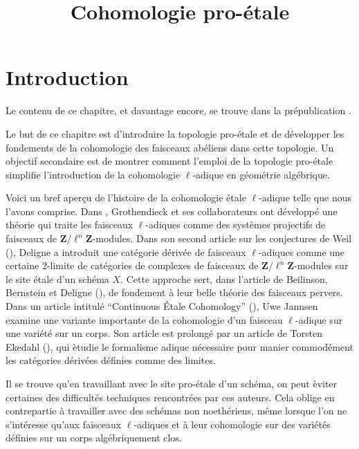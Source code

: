 

%


\title{Cohomologie pro-\'etale}


\maketitle

\label{section-phantom}

\tableofcontents

\section{Introduction}
\label{section-introduction}

\noindent
Le contenu de ce chapitre, et davantage encore, se trouve dans la pr\'epublication \cite{BS}.

\medskip\noindent
Le but de ce chapitre est d'introduire la topologie pro-\'etale et de
d\'evelopper les fondements de la cohomologie des faisceaux ab\'eliens dans cette topologie.
Un objectif secondaire est de montrer comment l'emploi de la topologie pro-\'etale simplifie
l'introduction de la cohomologie $\ell$-adique en g\'eom\'etrie alg\'ebrique.

\medskip\noindent
Voici un bref aper\c{c}u de l'histoire de la cohomologie \'etale $\ell$-adique
telle que nous l'avons comprise.
Dans \cite[Expos\'es V et VI]{SGA5}, Grothendieck et ses collaborateurs ont d\'evelopp\'e une th\'eorie
qui traite les faisceaux $\ell$-adiques comme des syst\`emes projectifs de faisceaux de
$\mathbf{Z}/\ell^n\mathbf{Z}$-modules.
Dans son second article sur les conjectures de Weil (\cite{WeilII}), Deligne a introduit
une cat\'egorie d\'eriv\'ee de faisceaux $\ell$-adiques comme une certaine 2-limite de cat\'egories
de complexes de faisceaux de $\mathbf{Z}/\ell^n\mathbf{Z}$-modules sur le
site \'etale d'un sch\'ema $X$. Cette approche sert, dans l'article de
Beilinson, Bernstein et Deligne (\cite{BBD}), de fondement \`a leur
belle th\'eorie des faisceaux pervers. Dans un article intitul\'e ``Continuous
\'Etale Cohomology'' (\cite{Jannsen}), Uwe Jannsen examine une variante importante
de la cohomologie d'un faisceau $\ell$-adique sur une vari\'et\'e sur un corps.
Son article est prolong\'e par un article de Torsten Ekedahl (\cite{Ekedahl}),
qui \`etudie le formalisme adique n\'ecessaire pour manier commod\'ement les cat\'egories
d\'eriv\'ees d\'efinies comme des limites.

\medskip\noindent
Il se trouve qu'en travaillant avec le site pro-\'etale d'un sch\'ema,
on peut \`eviter certaines des difficult\'es techniques rencontr\'ees par ces auteurs.
Cela oblige en contrepartie \`a travailler avec des sch\'emas non noeth\'eriens,
m\^eme lorsque l'on ne s'int\'eresse qu'aux faisceaux $\ell$-adiques
et \`a leur cohomologie sur des vari\'et\'es d\'efinies sur un corps alg\'ebriquement clos.

